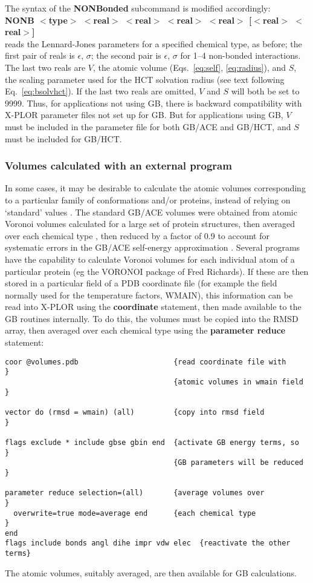 \documentclass[12pt]{report}
\begin{document}
The syntax of the {\bf NONBonded} subcommand is modified accordingly: \\
{\bf NONB $<$type$>$ $<$real$>$ $<$real$>$ $<$real$>$ $<$real$>$ [$<$real$>$ $<$real$>$]} \\
reads the Lennard-Jones parameters for a specified chemical type, as before;
the first pair of reals is $\epsilon$, $\sigma$; the second pair is $\epsilon$,
$\sigma$ for 1--4 non-bonded interactions. The last two reals are $V$, the atomic
volume (Eqs.\ \ref{eq:self}, \ref{eq:radius}), and $S$, the scaling parameter
used for the HCT solvation radius (see text following Eq.\ \ref{eq:bsolvhct}). If the
last two reals are omitted, $V$ and $S$ will both be set to 9999. Thus, for applications
not using GB, there is backward compatibility with X-PLOR parameter files not set up
for GB. But for applications using GB, $V$ must be included in the parameter file for
both GB/ACE and GB/HCT, and $S$ must be included for GB/HCT. 

\subsubsection{Volumes calculated with an external program}
In some cases, it may be desirable to calculate the atomic volumes corresponding
to a particular family of conformations and/or proteins, instead of relying on
`standard' values \cite{Wagner99}. The standard GB/ACE volumes were obtained from
atomic Voronoi volumes calculated for a large set of protein structures, then averaged
over each chemical
type \cite{Schaefer01}, then reduced by a factor of 0.9 to account for systematic
errors in the GB/ACE self-energy approximation \cite{Calimet01}. Several programs
have the capability to calculate Voronoi volumes for each individual atom of a
particular protein (eg the VORONOI package of Fred Richards). If these are then
stored in a particular field of a PDB coordinate file (for example the field normally
used for the temperature factors, WMAIN), this information can be read into X-PLOR using
the {\bf coordinate} statement, then made available to the GB routines internally.
To do this, the volumes must be copied into the RMSD array, then averaged over
each chemical type using the {\bf parameter reduce} statement: \\
\begin{verbatim}
coor @volumes.pdb                      {read coordinate file with       }
                                       {atomic volumes in wmain field   }

vector do (rmsd = wmain) (all)         {copy into rmsd field            }

flags exclude * include gbse gbin end  {activate GB energy terms, so    }
                                       {GB parameters will be reduced   }

parameter reduce selection=(all)       {average volumes over            }
  overwrite=true mode=average end      {each chemical type              }
end
flags include bonds angl dihe impr vdw elec  {reactivate the other terms}
\end{verbatim}
The atomic volumes, suitably averaged, are then available for GB calculations.
\end{document}
